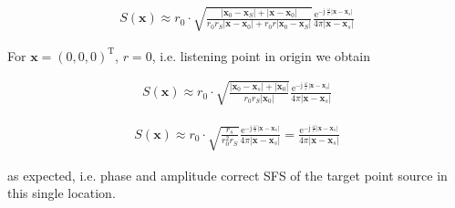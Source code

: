 \documentclass[a4paper,BCOR=15mm,10pt,twoside]{scrartcl}
\newcommand\e{\mathrm{e}}  %
\newcommand\im{\mathrm{j}}  %
\newcommand\jwc{\im\,\frac{\omega}{c}}  %
\renewcommand{\vec}[1]{\mathbf{#1}}  %
\begin{document}
\begin{align}
S(\vec{x}) \approx r_0 \cdot
\sqrt{\frac{|\vec{x}_0-\vec{x}_S| + |\vec{x}-\vec{x}_0|}{r_0 r_S |\vec{x} -\vec{x}_0| + r_0 r |\vec{x}_0-\vec{x}_S|}}
\frac{\e^{-\jwc |\vec{x}-\vec{x}_s|}}{4 \pi |\vec{x}-\vec{x}_s|} 
\end{align}

For $\vec{x} = (0,0,0)^\mathrm{T}$, $r = 0$, i.e. listening point in origin we obtain

\begin{align}
S(\vec{x}) \approx r_0 \cdot
\sqrt{\frac{|\vec{x}_0-\vec{x}_s| + |\vec{x}_0|}{r_0 r_S |\vec{x}_0|}}
\frac{\e^{-\jwc |\vec{x}-\vec{x}_s|}}{4 \pi |\vec{x}-\vec{x}_s|} 
\end{align}

\begin{align}
S(\vec{x}) \approx r_0 \cdot
\sqrt{\frac{r_s}{r^2_0 r_S}}
\frac{\e^{-\jwc |\vec{x}-\vec{x}_s|}}{4 \pi |\vec{x}-\vec{x}_s|} =
\frac{\e^{-\jwc |\vec{x}-\vec{x}_s|}}{4 \pi |\vec{x}-\vec{x}_s|}
\end{align}

as expected, i.e. phase and amplitude correct SFS of the target point source in this single location.
\end{document}
